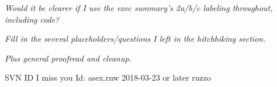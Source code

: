 \documentclass{article}\usepackage[]{graphicx}\usepackage[]{color}
\begin{document}
\textit{Would it be clearer if I use the exec summary's 2a/b/c labeling throughout, including code?}

\textit{Fill in the several placeholders/questions I left in the hitchhiking section.}

\textit{Plus general proofread and cleanup.}

\vfill\footnotesize\flushright SVN ID I miss you $ $Id: asex.rnw 2018-03-23 or later ruzzo $ $
\end{document}
